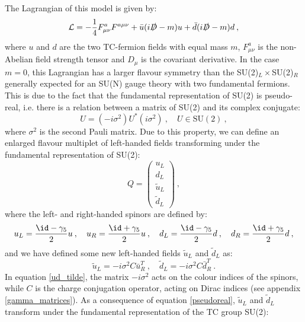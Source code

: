 The Lagrangian of this model is given by:
\begin{equation}
\mathcal L = - \frac{1}{4} F_{\mu\nu}^a F^{a\mu\nu}  + \bar u (i \slashed D - m) u + \bar d (i \slashed D - m) d \: ,
\label{SU2_Lagrangian}
\end{equation}
%
where $u$ and $d$ are the two TC-fermion fields with equal mass $m$, $F_{\mu\nu}^a$ is the non-Abelian field strength tensor and $D_{\mu}$ is the covariant derivative. In the case $m=0$, this Lagrangian has a larger flavour symmetry than the SU(2)$_L \times$SU(2)$_R$ generally expected for an SU(N) gauge theory with two fundamental fermions. This is due to the fact that the fundamental representation of SU(2) is pseudo-real, i.e. there is a relation between a matrix of SU(2) and its complex conjugate:
%
\begin{equation}
U = (-i \sigma^2) U^* (i \sigma^2) \: , \quad U \in\mathrm{ SU}(2) \: ,
\label{pseudoreal}
\end{equation}
%
where $\sigma^2$ is the second Pauli matrix.
Due to this property, we can define an enlarged flavour multiplet of left-handed fields transforming under the fundamental representation of SU(2):
\begin{equation}
Q = 
\begin{pmatrix}
u_L \\
d_L \\
\tilde u_L \\
\tilde d_L
\end{pmatrix} \: , 
\end{equation}
%
where the left- and right-handed spinors are defined by: 
\begin{equation}
u_L = \frac{\id - \gamma_5}{2}u \: ,  \quad u_R = \frac{\id + \gamma_5}{2}u \: , \quad  d_L = \frac{\id - \gamma_5}{2}d \: ,  \quad d_R = \frac{\id + \gamma_5}{2}d \: ,
\end{equation}
%
and we have defined some new left-handed fields $\tilde u_L$ and $\tilde d_L$ as:
%
\begin{equation}
\tilde u_L = -i \sigma^2 C \bar u_R^T \: , \quad \tilde d_L = -i \sigma^2 C \bar d_R^T \: .
\label{ud_tilde}
\end{equation}
%
In equation \ref{ud_tilde}, the matrix $-i \sigma^2$ acts on the colour indices of the spinors, while $C$ is the charge conjugation operator, acting on Dirac indices (see appendix \ref{gamma_matrices}). As a consequence of equation \ref{pseudoreal}, $\tilde u_L$ and $\tilde d_L$ transform under the fundamental representation of the TC group SU(2):
\begin{center}
\end{center}

